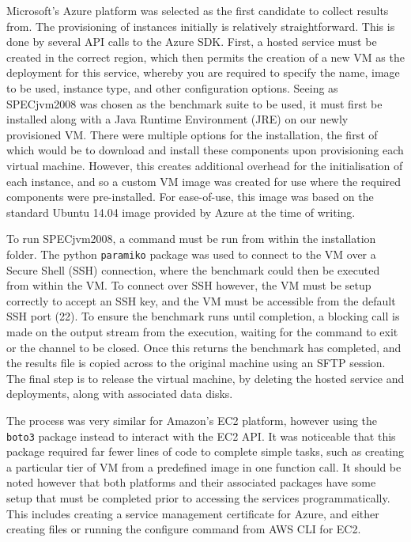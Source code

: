 \documentclass{entcs} \usepackage{entcsmacro}
\begin{document}
Microsoft's Azure platform was selected as the first candidate to collect results from. The provisioning of instances initially is relatively straightforward. This is done by several API calls to the Azure SDK. First, a hosted service must be created in the correct region, which then permits the creation of a new VM as the deployment for this service, whereby you are required to specify the name, image to be used, instance type, and other configuration options. Seeing as SPECjvm2008 was chosen as the benchmark suite to be used, it must first be installed along with a Java Runtime Environment (JRE) on our newly provisioned VM. There were multiple options for the installation, the first of which would be to download and install these components upon provisioning each virtual machine. However, this creates additional overhead for the initialisation of each instance, and so a custom VM image \cite{azurevmimage} was created for use where the required components were pre-installed. For ease-of-use, this image was based on the standard Ubuntu 14.04 image provided by Azure at the time of writing.

To run SPECjvm2008, a command must be run from within the installation folder. The python \texttt{paramiko} package was used to connect to the VM over a Secure Shell (SSH) connection, where the benchmark could then be executed from within the VM. To connect over SSH however, the VM must be setup correctly to accept an SSH key, and the VM must be accessible from the default SSH port (22). To ensure the benchmark runs until completion, a blocking call is made on the output stream from the execution, waiting for the command to exit or the channel to be closed. Once this returns the benchmark has completed, and the results file is copied across to the original machine using an SFTP session. The final step is to release the virtual machine, by deleting the hosted service and deployments, along with associated data disks.

The process was very similar for Amazon's EC2 platform, however using the \texttt{boto3} package instead to interact with the EC2 API. It was noticeable that this package required far fewer lines of code to complete simple tasks, such as creating a particular tier of VM from a predefined image in one function call. It should be noted however that both platforms and their associated packages have some setup that must be completed prior to accessing the services programmatically. This includes creating a service management certificate for Azure, and either creating files or running the configure command from AWS CLI for EC2.
\end{document}
